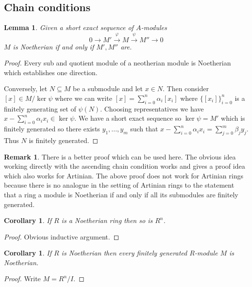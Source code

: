 \documentclass[12pt]{article}
\theoremstyle{plain}
\newtheorem{lemma}[thm]{Lemma}
\newtheorem{cor}[thm]{Corollary}
\theoremstyle{definition}
\newtheorem{remark}[thm]{Remark}
\newcommand{\lto}{\longrightarrow}
\begin{document}
	\subsection{Chain conditions}
	\begin{lemma}
		\label{lem:neotherian_ses} Given a short exact sequence of $A$-modules
		\[0 \lto M' \stackrel{\varphi}{\lto} M \stackrel{\psi}{\lto} M'' \lto 0\]
		$M$ is Noetherian if and only if $M',M''$ are.
	\end{lemma}
	\begin{proof}
		Every sub and quotient module of a neotherian module is Noetherian which establishes one direction.
		
		Conversely, let $N \subseteq M$ be a submodule and let $x \in N$. Then consider $[x] \in M/\ker \psi$ where we can write $[x] = \sum_{i = 0}^n \alpha_i [x_i]$ where $\lbrace [x_i]\rbrace_{i = 0}^n$ is a finitely generating set of $\psi(N)$. Choosing representatives we have $x - \sum_{i = 0}^n\alpha_i x_i \in \ker \psi$. We have a short exact sequence so $\ker \psi = M'$ which is finitely generated so there exists $y_1,...,y_m$ such that $x - \sum_{i = 0}^n \alpha_i x_i = \sum_{j = 0}^m\beta_j y_j$. Thus $N$ is finitely generated.
	\end{proof}
	\begin{remark}
		There is a better proof which can be used here. The obvious idea working directly with the ascending chain condition works and gives a proof idea which also works for Artinian. The above proof does not work for Artinian rings because there is no analogue in the setting of Artinian rings to the statement that a ring a module is Noetherian if and only if all its submodules are finitely generated.
	\end{remark}
	\begin{cor}
		If $R$ is a Noetherian ring then so is $R^n$.
	\end{cor}
	\begin{proof}
		Obvious inductive argument.
	\end{proof}
	\begin{cor}
		If $R$ is Noetherian then every finitely generated $R$-module $M$ is Noetherian.
	\end{cor}
	\begin{proof}
		Write $M = R^n/I$.
	\end{proof}
\end{document}
